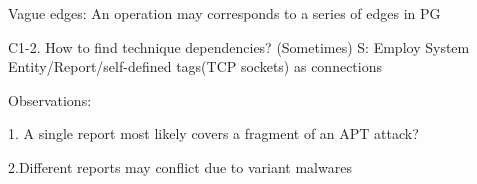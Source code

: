Vague edges: An operation may corresponds to a series of edges in PG

C1-2. How to find technique dependencies? (Sometimes)
S: Employ System Entity/Report/self-defined tags(TCP sockets) as connections


Observations:

1. A single report most likely covers a fragment of an APT attack?

2.Different reports may conflict due to variant malwares


